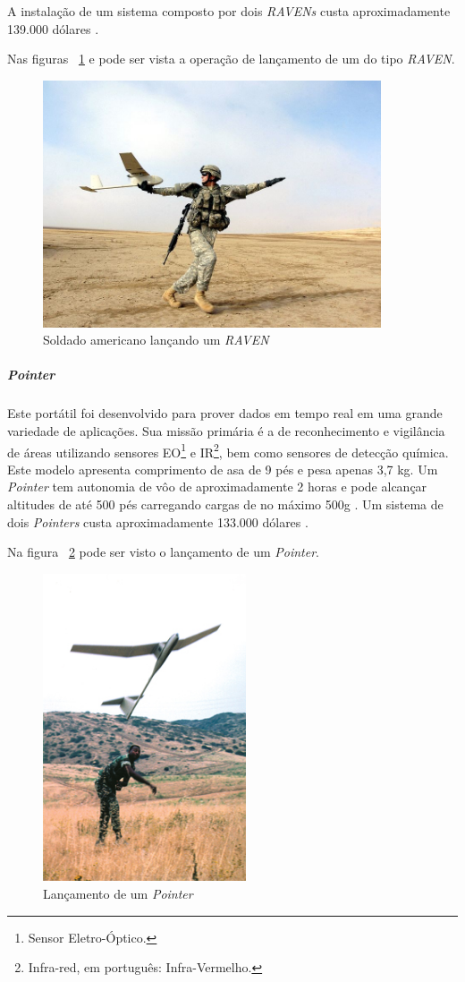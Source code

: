 A instalação de um sistema composto por dois \emph{RAVENs} custa aproximadamente 139.000 dólares \cite{Drew2005}. 

Nas figuras ~\ref{fig:raven} e  pode ser vista a operação de lançamento de um \vant do tipo \emph{RAVEN}.

\begin{figure}[h!]
\centering
\includegraphics[width=10cm]{pictures/launching_raven.jpg}
\caption{Soldado americano lançando um \emph{RAVEN} }
 \label{fig:raven}
\end{figure}




\subparagraph{ \emph{Pointer}}
Este \vant  portátil foi desenvolvido para prover dados em tempo real em uma grande variedade de aplicações. Sua missão primária é a de reconhecimento e vigilância de áreas
utilizando sensores EO\footnote{Sensor Eletro-Óptico.} e IR\footnote{Infra-red, em português: Infra-Vermelho.}, bem como sensores de detecção química. Este modelo apresenta comprimento de asa de 9 pés e pesa apenas 3,7 kg. Um \emph{Pointer} tem autonomia de vôo de aproximadamente 2 horas e pode alcançar altitudes de até 500 pés carregando cargas de no máximo 500g \cite{uas_2009}. Um sistema de dois \emph{Pointers} custa aproximadamente 133.000 dólares \cite{Bone2003}. 

Na figura ~\ref{fig:launching_pointer} pode ser visto o lançamento de um \emph{Pointer}. 

\begin{figure}[h!]
\centering
\includegraphics[width=6cm]{pictures/launching_pointer.jpg}
\caption{Lançamento de um \emph{Pointer} }
 \label{fig:launching_pointer}
\end{figure}


